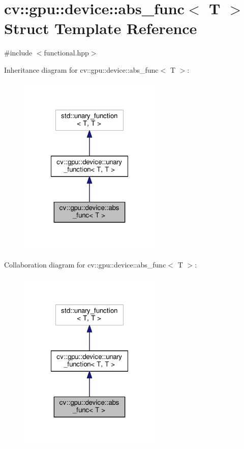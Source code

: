 \hypertarget{structcv_1_1gpu_1_1device_1_1abs__func}{\section{cv\-:\-:gpu\-:\-:device\-:\-:abs\-\_\-func$<$ T $>$ Struct Template Reference}
\label{structcv_1_1gpu_1_1device_1_1abs__func}
}


{\ttfamily \#include $<$functional.\-hpp$>$}



Inheritance diagram for cv\-:\-:gpu\-:\-:device\-:\-:abs\-\_\-func$<$ T $>$\-:\nopagebreak
\begin{figure}[H]
\begin{center}
\leavevmode
\includegraphics[width=192pt]{structcv_1_1gpu_1_1device_1_1abs__func__inherit__graph}
\end{center}
\end{figure}


Collaboration diagram for cv\-:\-:gpu\-:\-:device\-:\-:abs\-\_\-func$<$ T $>$\-:\nopagebreak
\begin{figure}[H]
\begin{center}
\leavevmode
\includegraphics[width=192pt]{structcv_1_1gpu_1_1device_1_1abs__func__coll__graph}
\end{center}
\end{figure}
